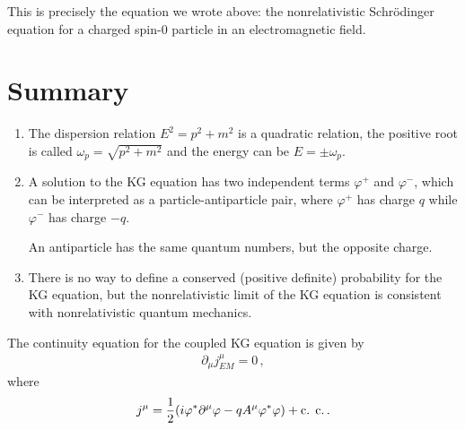 \documentclass[main.tex]{subfiles}
\begin{document}
This is precisely the equation we wrote above: the nonrelativistic Schrödinger equation for a charged spin-0 particle in an electromagnetic field. 

\section{Summary}

\begin{enumerate}
  \item The dispersion relation \(E^2 = p^2+m^2\) is a quadratic relation, the positive root is called \(\omega_{p} = \sqrt{p^2+m^2}\) and the energy can be \(E = \pm \omega_{p}\). 
  \item A solution to the KG equation has two independent terms \(\varphi^{+}\) and \(\varphi^{-}\), which can be interpreted as a particle-antiparticle pair, where \(\varphi^{+}\) has charge \(q\) while \(\varphi^{-}\) has charge \(-q\). 
  
  An antiparticle has the same quantum numbers, but the opposite charge. 
  \item There is no way to define a conserved (positive definite) probability for the KG equation, but the nonrelativistic limit of the KG equation is consistent with nonrelativistic quantum mechanics. 
\end{enumerate}

\begin{claim}
The continuity equation for the coupled KG equation is given by 
%
\begin{align}
\partial_{\mu } j^{\mu }_{EM} = 0
\,,
\end{align}
%
where 
%
\begin{align}
j^{\mu } = \frac{1}{2} \qty(i \varphi^{*} \partial^{\mu } \varphi   - q A^{\mu } \varphi^{*} \varphi ) + \text{c. c.}
\,.
\end{align}
\end{claim}
\end{document}
